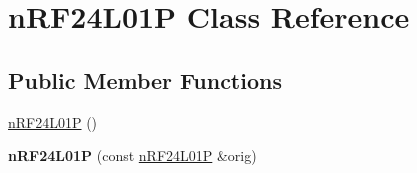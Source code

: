 \hypertarget{classnRF24L01P}{\section{n\+R\+F24\+L01\+P Class Reference}
\label{classnRF24L01P}
}
\subsection*{Public Member Functions}
\begin{DoxyCompactItemize}
\item 
\hyperlink{classnRF24L01P_a108264099d7fcbd79784e349d38ea74b}{n\+R\+F24\+L01\+P} ()
\item 
\hypertarget{classnRF24L01P_a4fc07a604cfc8248bd603dca58cec6c9}{{\bfseries n\+R\+F24\+L01\+P} (const \hyperlink{classnRF24L01P}{n\+R\+F24\+L01\+P} \&orig)}\label{classnRF24L01P_a4fc07a604cfc8248bd603dca58cec6c9}


\end{DoxyCompactItemize}

